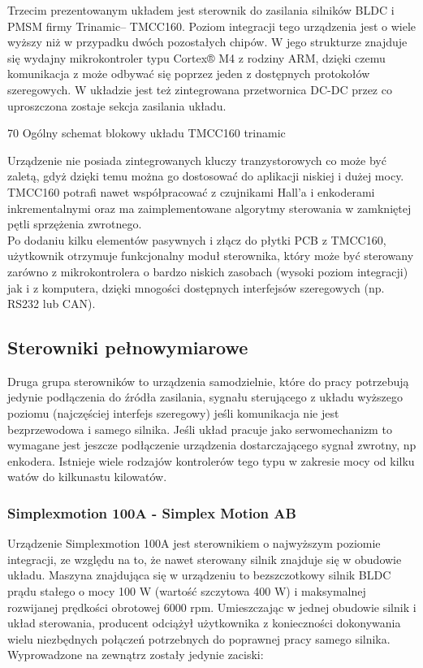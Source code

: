 Trzecim prezentowanym układem jest sterownik do zasilania silników BLDC i PMSM firmy Trinamic-- TMCC160. Poziom integracji tego urządzenia jest o wiele wyższy niż w przypadku dwóch pozostałych chipów. W jego strukturze znajduje się wydajny mikrokontroler typu Cortex® M4 z rodziny ARM, dzięki czemu komunikacja z może odbywać się poprzez jeden z dostępnych protokołów szeregowych. W układzie jest też zintegrowana przetwornica DC-DC przez co uproszczona zostaje sekcja zasilania układu. 

	{70}
	{Ogólny schemat blokowy układu TMCC160}
	{trinamic}

Urządzenie nie posiada zintegrowanych kluczy tranzystorowych co może być zaletą, gdyż dzięki temu można go dostosować do aplikacji niskiej i dużej mocy. TMCC160 potrafi nawet współpracować z czujnikami Hall'a i enkoderami inkrementalnymi oraz ma zaimplementowane algorytmy sterowania w zamkniętej pętli sprzężenia zwrotnego. \\

Po dodaniu kilku elementów pasywnych i złącz do płytki PCB z TMCC160, użytkownik otrzymuje funkcjonalny moduł sterownika, który może być sterowany zarówno z mikrokontrolera o bardzo niskich zasobach (wysoki poziom integracji) jak i z komputera, dzięki mnogości dostępnych interfejsów szeregowych (np. RS232 lub CAN).

\subsection{Sterowniki pełnowymiarowe}

Druga grupa sterowników to urządzenia samodzielnie, które do pracy potrzebują jedynie podłączenia do źródła zasilania, sygnału sterującego z układu wyższego poziomu (najczęściej interfejs szeregowy) jeśli komunikacja nie jest bezprzewodowa i samego silnika. Jeśli układ pracuje jako serwomechanizm to wymagane jest jeszcze podłączenie urządzenia dostarczającego sygnał zwrotny, np enkodera. Istnieje wiele rodzajów kontrolerów tego typu w zakresie mocy od kilku watów do kilkunastu kilowatów. 

\subsubsection{Simplexmotion 100A - Simplex Motion AB}
\label{sss:simplex}

Urządzenie Simplexmotion 100A jest sterownikiem o najwyższym poziomie integracji, ze względu na to, że nawet sterowany silnik znajduje się w obudowie układu. Maszyna znajdująca się w urządzeniu to bezszczotkowy silnik BLDC prądu stałego o mocy 100 W (wartość szczytowa 400 W) i maksymalnej rozwijanej prędkości obrotowej 6000 rpm. Umieszczając w jednej obudowie silnik i układ sterowania, producent odciążył użytkownika z konieczności dokonywania wielu niezbędnych połączeń potrzebnych do poprawnej pracy samego silnika. Wyprowadzone na zewnątrz zostały jedynie zaciski:


